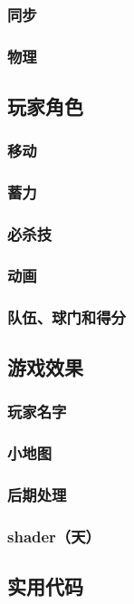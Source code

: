 \documentclass[conference]{IEEEtran}
\begin{document}
\subsubsection{同步}
\subsubsection{物理}


\subsection{玩家角色}
\subsubsection{移动}
\subsubsection{蓄力}
\subsubsection{必杀技}
\subsubsection{动画}
\subsubsection{队伍、球门和得分}


\subsection{游戏效果}
\subsubsection{玩家名字}
\subsubsection{小地图}
\subsubsection{后期处理}
\subsubsection{shader（天）}


\subsection{实用代码}
\end{document}
